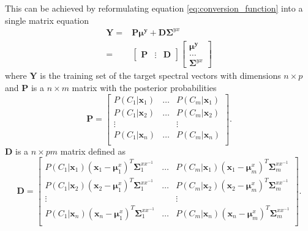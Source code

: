 This can be achieved by reformulating equation \eqref{eq:conversion_function} into a single matrix equation
\begin{equation}
	\label{eq:least_square_problem}
	\begin{split}
		\mathbf{Y} = &\mathbf{P}\boldsymbol{\mu^y} + \mathbf{D}\mathbf{\Sigma}^{yx} \\
		= & \begin{bmatrix}
			\mathbf{P}& \vdots &\mathbf{D}
		\end{bmatrix}
		\begin{bmatrix}
			\boldsymbol{\mu^y} \\
			\dots \\
			\mathbf{\Sigma}^{yx}
		\end{bmatrix}
	\end{split}
\end{equation}
where $\mathbf{Y}$ is the training set of the target spectral vectors with dimensions $n\times p$ and $\mathbf{P}$ is a $n \times m$ matrix with the posterior probabilities
\begin{equation}
	\label{eq:P_matrix}
	\mathbf{P} = \begin{bmatrix}
		P(C_1\vert \mathbf{x}_1) & \dots & P(C_m\vert \mathbf{x}_1) \\
		P(C_1\vert \mathbf{x}_2) & \dots & P(C_m\vert \mathbf{x}_2) \\
		\vdots & & \vdots \\
		P(C_1\vert \mathbf{x}_n) & \dots & P(C_m\vert \mathbf{x}_n) \\
	\end{bmatrix}.
\end{equation}
$\mathbf{D}$ is a $n \times pm$ matrix defined as
\begin{equation}
	\label{eq:D_matrix}
	\mathbf{D} = \begin{bmatrix}
		P(C_1\vert \mathbf{x}_1)(\mathbf{x}_1 - \boldsymbol{\mu}_1^x)^T\mathbf{\Sigma}_1^{xx^{-1}} & \dots & P(C_m\vert \mathbf{x}_1)(\mathbf{x}_1 - \boldsymbol{\mu}_m^x)^T\mathbf{\Sigma}_m^{xx^{-1}} \\
		P(C_1\vert \mathbf{x}_2)(\mathbf{x}_2 - \boldsymbol{\mu}_1^x)^T\mathbf{\Sigma}_1^{xx^{-1}} & \dots & P(C_m\vert \mathbf{x}_2)(\mathbf{x}_2 - \boldsymbol{\mu}_m^x)^T\mathbf{\Sigma}_m^{xx^{-1}} \\
		\vdots & & \vdots \\
		P(C_1\vert \mathbf{x}_n)(\mathbf{x}_n - \boldsymbol{\mu}_1^x)^T\mathbf{\Sigma}_1^{xx^{-1}} & \dots & P(C_m\vert \mathbf{x}_n)(\mathbf{x}_n - \boldsymbol{\mu}_m^x)^T\mathbf{\Sigma}_m^{xx^{-1}} \\
	\end{bmatrix}.
\end{equation}

